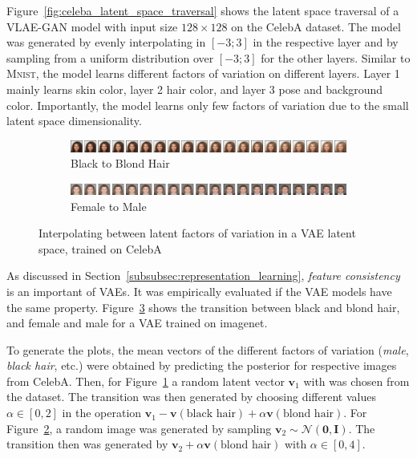 Figure~\ref{fig:celeba_latent_space_traversal} shows the latent space traversal of a \ac{VLAE}-\ac{GAN} model with input size $128\times 128$ on the CelebA dataset.
The model was generated by evenly interpolating in $[-3; 3]$ in the respective layer and by sampling from a uniform distribution over $[-3; 3]$ for the other layers.
Similar to \textsc{Mnist}, the model learns different factors of variation on different layers.
Layer 1 mainly learns skin color, layer 2 hair color, and layer 3 pose and background color.
Importantly, the model learns only few factors of variation due to the small latent space dimensionality.

\begin{figure}
    \centering
    \begin{subfigure}{\textwidth}
        \includegraphics[width=\textwidth]{images/latent_space_traversals/vae_celeba_black_to_blond.png}
        \caption{Black to Blond Hair}
        \label{subfig:black_to_blond}
    \end{subfigure}
    \begin{subfigure}{\textwidth}
        \includegraphics[width=\textwidth]{images/latent_space_traversals/vae_celeba_man_to_woman.png}
        \caption{Female to Male}
        \label{subfig:female_to_male}
    \end{subfigure}
    \caption[Interpolating between black and blond hair, man and woman]{Interpolating between latent factors of variation in a \ac{VAE} latent space, trained on CelebA}
    \label{fig:vae_celeba_black_to_blond_man_to_woman}
\end{figure}

As discussed in Section~\ref{subsubsec:representation_learning}, \textit{feature consistency} is an important of \acp{VAE}.
It was empirically evaluated if the \ac{VAE} models have the same property.
Figure~\ref{fig:vae_celeba_black_to_blond_man_to_woman} shows the transition between black and blond hair, and female and male for a \ac{VAE} trained on imagenet.

To generate the plots, the mean vectors of the different factors of variation (\textit{male}, \textit{black hair}, etc.) were obtained by predicting the posterior for respective images from CelebA.
Then, for Figure~\ref{subfig:black_to_blond} a random latent vector $\bm{v}_1$ with  was chosen from the dataset.
The transition was then generated by choosing different values $\alpha \in [0, 2]$ in the operation $\bm{v}_1 - \bm{v}(\text{black hair}) + \alpha\bm{v}(\text{blond hair})$.
For Figure~\ref{subfig:female_to_male}, a random image was generated by sampling $\bm{v}_2\sim \mathcal{N}(\bm{0}, \bm{I})$.
The transition then was generated by $\bm{v}_2 + \alpha\bm{v}(\text{blond hair})$ with $\alpha \in [0, 4]$.

